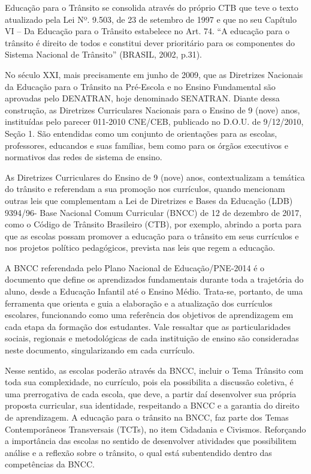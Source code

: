 \documentclass[output=paper,colorlinks,citecolor=brown]{langscibook}
\begin{document}
Educação para o Trânsito se consolida através do próprio CTB que teve o texto atualizado pela Lei Nº. 9.503, de 23 de setembro de 1997 e que no seu Capítulo VI – Da Educação para o Trânsito estabelece no Art. 74. “A educação para o trânsito é direito de todos e constitui dever prioritário para os componentes do Sistema Nacional de Trânsito” (BRASIL, 2002, p.31). \vskip0.3cm

No século XXI, mais precisamente em junho de 2009, que as Diretrizes Nacionais da Educação para o Trânsito na Pré-Escola e no Ensino Fundamental são aprovadas pelo DENATRAN, hoje denominado SENATRAN. Diante dessa construção, as Diretrizes Curriculares Nacionais para o Ensino de 9 (nove) anos, instituídas pelo parecer 011-2010 CNE/CEB, publicado no D.O.U. de 9/12/2010, Seção 1. São entendidas como um conjunto de orientações para as escolas, professores, educandos e suas famílias, bem como para os órgãos executivos e normativos das redes de sistema de ensino.\vskip0.3cm

As Diretrizes Curriculares do Ensino de 9 (nove) anos, contextualizam a temática do trânsito e referendam a sua promoção nos currículos, quando mencionam outras leis que complementam a Lei de Diretrizes e Bases da Educação (LDB) 9394/96- Base Nacional Comum Curricular (BNCC) de 12 de dezembro de 2017, como o Código de Trânsito Brasileiro (CTB), por exemplo, abrindo a porta para que as escolas possam promover a educação para o trânsito em seus currículos e nos projetos político pedagógicos, prevista nas leis que regem a educação.\vskip0.3cm

A BNCC referendada pelo Plano Nacional de Educação/PNE-2014 é o documento que define os aprendizados fundamentais durante toda a trajetória do aluno, desde a Educação Infantil até o Ensino Médio. Trata-se, portanto, de uma ferramenta que orienta e guia a elaboração e a atualização dos currículos escolares, funcionando como uma referência dos objetivos de aprendizagem em cada etapa da formação dos estudantes. Vale ressaltar que as particularidades sociais, regionais e metodológicas de cada instituição de ensino são consideradas neste documento, singularizando em cada currículo.\vskip0.3cm

Nesse sentido, as escolas poderão através da BNCC, incluir o Tema Trânsito com toda sua complexidade, no currículo, pois ela possibilita a discussão coletiva, é uma prerrogativa de cada escola, que deve, a partir daí desenvolver sua própria proposta curricular, sua identidade, respeitando a BNCC e a garantia do direito de aprendizagem. A educação para o trânsito na BNCC, faz parte dos Temas Contemporâneos Transversais (TCTs), no item Cidadania e Civismos. Reforçando a importância das escolas no sentido de desenvolver atividades que possibilitem análise e a reflexão sobre o trânsito, o qual está subentendido dentro das competências da BNCC.\vskip0.3cm
\end{document}
